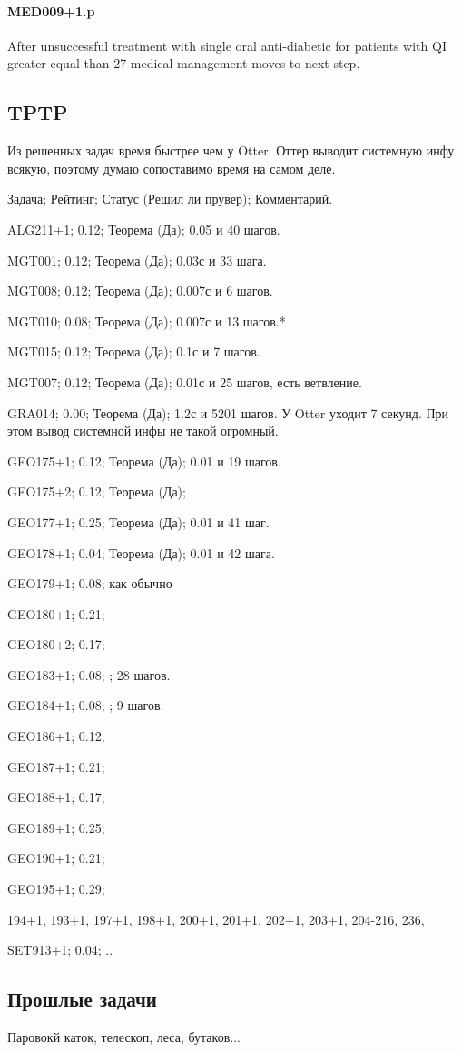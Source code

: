 \paragraph{MED009+1.p}
After unsuccessful treatment with single oral anti-diabetic for patients with QI greater equal than 27 medical management moves to next step.

\subsection{TPTP}
Из решенных задач время быстрее чем у Otter. Оттер выводит системную инфу всякую, поэтому думаю сопоставимо время на самом деле.

Задача; Рейтинг; Статус (Решил ли прувер); Комментарий.

ALG211+1; 0.12; Теорема (Да); 0.05 и 40 шагов.

MGT001; 0.12; Теорема (Да); 0.03с и 33 шага.

MGT008; 0.12; Теорема (Да); 0.007с и 6 шагов.

MGT010; 0.08; Теорема (Да); 0.007с и 13 шагов.*

MGT015; 0.12; Теорема (Да); 0.1с и 7 шагов.

MGT007; 0.12; Теорема (Да); 0.01с и 25 шагов, есть ветвление.

GRA014; 0.00; Теорема (Да); 1.2с и 5201 шагов. У Otter уходит 7 секунд. При этом вывод системной инфы не такой огромный.

GEO175+1; 0.12; Теорема (Да); 0.01 и 19 шагов.

GEO175+2; 0.12; Теорема (Да);

GEO177+1; 0.25; Теорема (Да); 0.01 и 41 шаг.

GEO178+1; 0.04; Теорема (Да); 0.01 и 42 шага.

GEO179+1; 0.08; как обычно

GEO180+1; 0.21;

GEO180+2; 0.17;

GEO183+1; 0.08; ; 28 шагов.

GEO184+1; 0.08; ; 9 шагов.

GEO186+1; 0.12;

GEO187+1; 0.21;

GEO188+1; 0.17;

GEO189+1; 0.25;

GEO190+1; 0.21;

GEO195+1; 0.29;

194+1, 193+1, 197+1, 198+1, 200+1, 201+1, 202+1, 203+1, 204-216, 236,   

SET913+1; 0.04; ..

\subsection{Прошлые задачи}

Паровокй каток, телескоп, леса, бутаков...






